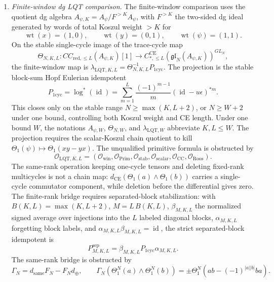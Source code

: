 \begin{enumerate}
  \item \emph{Finite-window dg LQT comparison.}
  The finite-window comparison uses the quotient dg algebra
  \(A_{\psi,K}=A_\psi/F^{>K}A_\psi\), with \(F^{>K}\) the two-sided
  dg ideal generated by words of total Koszul weight \(>K\) for
  \[
    \operatorname{wt}(x)=(1,0),\qquad
    \operatorname{wt}(y)=(0,1),\qquad
    \operatorname{wt}(\psi)=(1,1).
  \]
  On the stable single-cycle image of the trace-cycle map
  \[
    \Theta_{N,K,L}\colon CC_{\mathrm{red},\le L}(A_{\psi,K})[1]
    \to
    C_{*,\le L}^{\mathrm{CE}}(\mathfrak{gl}_N(A_{\psi,K}))^{GL_N},
  \]
  the finite-window map is
  \(\lambda_{\mathrm{LQT},K,L}
  =\Theta_{N,K,L}^{-1}P_{1\mathrm{cyc}}\).
  The projection is the stable block-sum Hopf Eulerian idempotent
  \[
    P_{1\mathrm{cyc}}
    =
    \log^*(\operatorname{id})
    =
    \sum_{m=1}^{L}\frac{(-1)^{m-1}}{m}
    (\operatorname{id}-u\epsilon)^{*m}.
  \]
  This closes only on the stable range
  \(N\geq\max(K,L+2)\), or \(N\geq W+2\) under one bound, controlling
  both Koszul weight and CE length.  Under one bound \(W\), the
  notations \(A_{\psi,W}\), \(\Theta_{N,W}\), and
  \(\lambda_{\mathrm{LQT},W}\) abbreviate \(K,L\le W\).  The
  projection requires the scalar-Koszul chain quotient to kill
  \(\Theta_1(\psi)\mapsto\Theta_1(xy-yx)\).  The unqualified primitive
  formula is obstructed by
  \[
    \mathcal O_{\mathrm{LQT},K,L}
    =
    (\mathcal O_{\mathrm{win}},
     \mathcal O_{\mathrm{Prim}},
     \mathcal O_{\mathrm{stab}},
     \mathcal O_{\mathrm{scalar}},
     \mathcal O_{\mathrm{CC}},
     \mathcal O_{\mathrm{Roos}}).
  \]
  The same-rank operation keeping one-cycle tensors and deleting
  fixed-rank multicycles is not a chain map:
  \(d_{\mathrm{CE}}(\Theta_1(a)\wedge\Theta_1(b))\) carries a
  single-cycle commutator component, while deletion before the
  differential gives zero.  The finite-rank bridge requires
  separated-block stabilization: with \(B(K,L)=\max(K,L+2)\),
  \(M=L\,B(K,L)\), \(\beta_{M,K,L}\) the normalized signed average
  over injections into the \(L\) labeled diagonal blocks,
  \(\alpha_{M,K,L}\) forgetting block labels, and
  \(\alpha_{M,K,L}\beta_{M,K,L}=\operatorname{id}\), the strict
  separated-block idempotent is
  \[
    P^{\mathrm{sep}}_{M,K,L}
    =
    \beta_{M,K,L}P_{1\mathrm{cyc}}\alpha_{M,K,L}.
  \]
  The same-rank bridge is obstructed by
  \[
    \Gamma_N=d_{\mathrm{same}}F_N-F_Nd_{\oplus},
    \qquad
    \Gamma_N(\Theta_1^N(a)\wedge\Theta_1^N(b))
    =
    \pm\Theta_1^N(ab-(-1)^{|a||b|}ba).
  \]


\end{enumerate}

